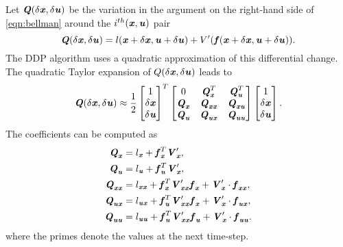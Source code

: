 Let $\bQ(\dx,\du)$ be the variation in the argument on the right-hand side of \cref{eqn:bellman} around the $i^{th} (\bx,\bu)$ pair
\begin{equation}\label{eqn:Q}
\bQ(\dx,\du)=l(\bx+\dx,\bu+\du)+V'(\bfun(\bx+\dx,\bu+\du)).
\end{equation}
The \gls{DDP} algorithm uses a quadratic approximation of this differential change. The quadratic Taylor expansion of $Q(\dx,\du)$ leads to
\begin{equation}\label{eqn:QApprox}
\bQ(\dx,\du) \approx \dfrac{1}{2} 
\begin{bmatrix} 1 \\ \dx \\ \du \end{bmatrix}^T 
\begin{bmatrix} 0 & \bQ_{\bx}^T & \bQ_{\bu}^T \\
\bQ_{\bx} & \bQ_{\bx\bx} & \bQ_{\bx\bu} \\
\bQ_{\bu} & \bQ_{\bu\bx} & \bQ_{\bu\bu} \end{bmatrix}
\begin{bmatrix} 1 \\ \dx \\ \du \end{bmatrix}.
\end{equation}
The coefficients can be computed as  
\begin{subequations}\label{eqn:QApproxCoeff}
\begin{align}
\bQ_{\bx} &= l_{\bx}+\bfun_{\bx}^T \bV_{\bx}^\prime, \\
\bQ_{\bu} &= l_{\bu}+\bfun_{\bu}^T \bV_{\bx}^\prime, \\
\bQ_{\bx\bx} &= l_{\bx\bx}+\bfun_{\bx}^T \bV_{\bx\bx}^\prime\bfun_{\bx}+\bV_{\bx}^\prime\cdot\bfun_{\bx\bx}  \label{subeqn:Qxx},\\
\bQ_{\bu\bx} &= l_{\bu\bx}+\bfun_{\bu}^T \bV_{\bx\bx}^\prime\bfun_{\bx}+\bV_{\bx}^\prime\cdot\bfun_{\bu\bx} \label{subeqn:Qux},\\
\bQ_{\bu\bu} &= l_{\bu\bu}+\bfun_{\bu}^T \bV_{\bx\bx}^\prime\bfun_{\bu}+\bV_{\bx}^\prime\cdot\bfun_{\bu\bu} \label{subeqn:Quu}.
\end{align}
\end{subequations}
where the primes denote the values at the next time-step.  

